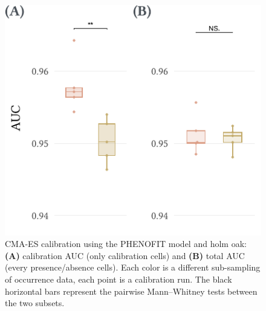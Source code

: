 \documentclass[11pt,]{article}
\begin{document}
\begin{figure}[H]

{\centering \includegraphics{figs/calibCMAESquercus} 

}

\caption{CMA-ES calibration using the PHENOFIT model and holm oak: \textbf{(A)} calibration AUC (only calibration cells) and \textbf{(B)} total AUC (every presence/absence cells). Each color is a different sub-sampling of occurrence data, each point is a calibration run. The black horizontal bars represent the pairwise Mann–Whitney tests between the two subsets.}\label{fig:calibCMAESquercus}
\end{figure}
\end{document}
